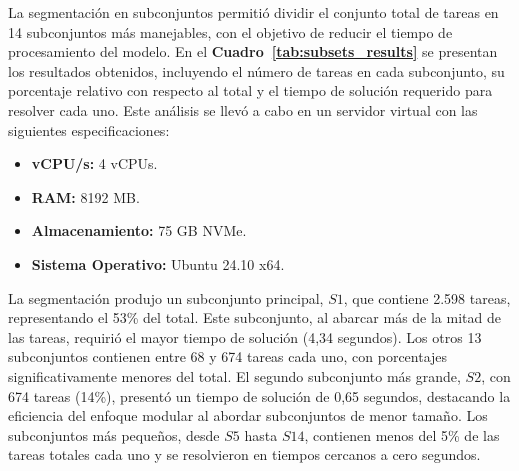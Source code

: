 \documentclass{article}
\begin{document}
La segmentación en subconjuntos permitió dividir el conjunto total de tareas en 14 subconjuntos más manejables, con el objetivo de reducir el tiempo de procesamiento del modelo. En el \textbf{Cuadro~\ref{tab:subsets_results}} se presentan los resultados obtenidos, incluyendo el número de tareas en cada subconjunto, su porcentaje relativo con respecto al total y el tiempo de solución requerido para resolver cada uno. Este análisis se llevó a cabo en un servidor virtual con las siguientes especificaciones:  

\begin{itemize}
    \item \textbf{vCPU/s:} 4 vCPUs.
    \item \textbf{RAM:} 8192 MB.
    \item \textbf{Almacenamiento:} 75 GB NVMe.
    \item \textbf{Sistema Operativo:} Ubuntu 24.10 x64.
\end{itemize}


La segmentación produjo un subconjunto principal, \( S1 \), que contiene 2.598 tareas, representando el 53\% del total. Este subconjunto, al abarcar más de la mitad de las tareas, requirió el mayor tiempo de solución (4,34 segundos). Los otros 13 subconjuntos contienen entre 68 y 674 tareas cada uno, con porcentajes significativamente menores del total. El segundo subconjunto más grande, \( S2 \), con 674 tareas (14\%), presentó un tiempo de solución de 0,65 segundos, destacando la eficiencia del enfoque modular al abordar subconjuntos de menor tamaño. Los subconjuntos más pequeños, desde \( S5 \) hasta \( S14 \), contienen menos del 5\% de las tareas totales cada uno y se resolvieron en tiempos cercanos a cero segundos.
\end{document}
